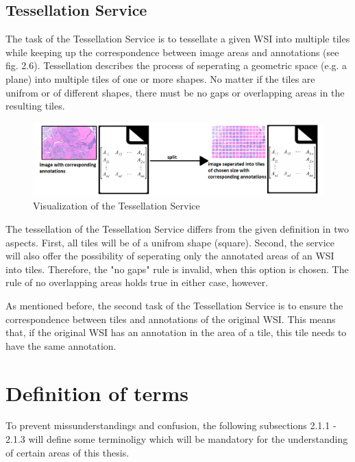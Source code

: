 \subsection{Tessellation Service}

The task of the Tessellation Service is to tessellate a given WSI into multiple tiles while keeping up the correspondence between image areas and annotations (see fig. 2.6). Tessellation describes the process of seperating a geometric space (e.g. a plane) into multiple tiles of one or more shapes. No matter if the tiles are unifrom or of different shapes, there must be no gaps or overlapping areas in the resulting tiles.

\begin{figure}[H]
	\begin{center}
		\includegraphics[scale=0.3]{img/processChainC.png}
		\caption{Visualization of the Tessellation Service}
		\label{fig:fig2.6}
	\end{center}
\end{figure}

The tessellation of the Tessellation Service differs from the given definition in two aspects. First, all tiles will be of a unifrom shape (square). Second, the service will also offer the possibility of seperating only the annotated areas of an WSI into tiles. Therefore, the "no gaps" rule is invalid, when this option is chosen. The rule of no overlapping areas holds true in either case, however.

As mentioned before, the second task of the Tessellation Service is to ensure the correspondence between tiles and annotations of the original WSI. This means that, if the original WSI has an annotation in the area of a tile, this tile needs to have the same annotation.

\section{Definition of terms}
To prevent missunderstandings and confusion, the following subsections 2.1.1 - 2.1.3 will define some terminoligy which will be mandatory for the understanding of certain areas of this thesis.


